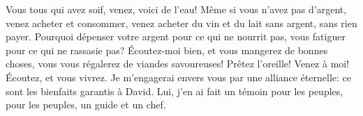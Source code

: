 Vous tous qui avez soif, venez, voici de l’eau!
Même si vous n’avez pas d’argent, venez acheter et consommer,
	venez acheter du vin et du lait sans argent, sans rien payer.
Pourquoi dépenser votre argent pour ce qui ne nourrit pas,
	vous fatiguer pour ce qui ne rassasie pas?
Écoutez-moi bien, et vous mangerez de bonnes choses,
	vous vous régalerez de viandes savoureuses!
Prêtez l’oreille! Venez à moi!
	Écoutez, et vous vivrez.
Je m’engagerai envers vous par une alliance éternelle:
	ce sont les bienfaits garantis à David.
Lui, j’en ai fait un témoin pour les peuples,
	pour les peuples, un guide et un chef.
